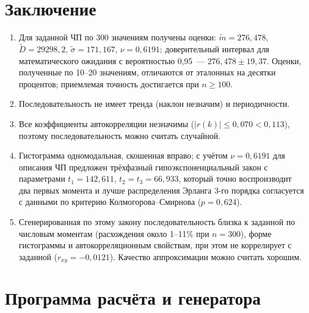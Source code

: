 \documentclass[a4paper,12pt]{article}
\begin{document}
\section{Заключение}
\begin{enumerate}
  \item Для заданной ЧП по 300 значениям получены оценки: $\tilde m=276{,}478$, $\tilde D=29298{,}2$, $\tilde\sigma=171{,}167$, $\nu=0{,}6191$; доверительный интервал для математического ожидания с вероятностью 0,95~--- $276{,}478\pm19{,}37$. Оценки, полученные по 10--20 значениям, отличаются от эталонных на десятки процентов; приемлемая точность достигается при $n\ge100$.
  \item Последовательность не имеет тренда (наклон незначим) и периодичности.
  \item Все коэффициенты автокорреляции незначимы ($|r(k)|\le0{,}070<0{,}113$), поэтому последовательность можно считать случайной.
  \item Гистограмма одномодальная, скошенная вправо; с учётом $\nu=0{,}6191$ для описания ЧП предложен трёхфазный гипоэкспоненциальный закон с параметрами $t_1=142{,}611$, $t_2=t_3=66{,}933$, который точно воспроизводит два первых момента и лучше распределения Эрланга 3-го порядка согласуется с данными по критерию Колмогорова--Смирнова ($p=0{,}624$).
  \item Сгенерированная по этому закону последовательность близка к заданной по числовым моментам (расхождения около 1--11\% при $n=300$), форме гистограммы и автокорреляционным свойствам, при этом не коррелирует с заданной ($r_{xy}=\ensuremath{-}0{,}0121$). Качество аппроксимации можно считать хорошим.
\end{enumerate}

\appendix
\section{Программа расчёта и генератора}\label{app:code}
\end{document}
